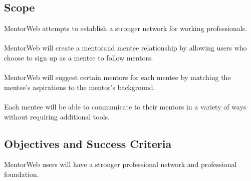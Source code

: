 \documentclass[11pt]{article}
\begin{document}
	\subsection{Scope}
		MentorWeb attempts to establish a stronger network for
		working professionals.\\
		\\
		MentorWeb will create a mentorand
		mentee relationship by allowing users who choose to sign
		up as a mentee to follow mentors.\\
		\\
		MentorWeb will suggest certain mentors for each
		mentee by matching the mentee's aspirations
		to the mentor's background.\\
		\\
		Each mentee will be able to communicate to their
		mentors in a variety of ways without requiring additional
		tools.

	\subsection{Objectives and Success Criteria}
		MentorWeb users will have a stronger professional
		network and professional foundation.

\end{document}
